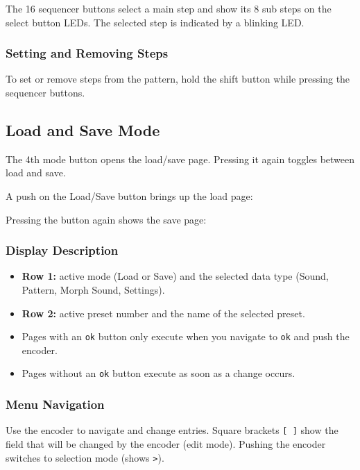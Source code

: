 The 16 sequencer buttons select a main step and show its 8 sub steps on
the select button LEDs. The selected step is indicated by a blinking
LED.

\subsubsection{Setting and Removing
Steps}\label{setting-and-removing-steps}

To set or remove steps from the pattern, hold the shift button while
pressing the sequencer buttons.

\subsection{Load and Save Mode}\label{load-and-save-mode}

The 4th mode button opens the load/save page. Pressing it again toggles
between load and save.

A push on the Load/Save button brings up the load page:


Pressing the button again shows the save page:


\subsubsection{Display Description}\label{display-description}

\begin{itemize}
\tightlist
\item
  \textbf{Row 1:} active mode (Load or Save) and the selected data type
  (Sound, Pattern, Morph Sound, Settings).
\item
  \textbf{Row 2:} active preset number and the name of the selected
  preset.
\item
  Pages with an \texttt{ok} button only execute when you navigate to
  \texttt{ok} and push the encoder.
\item
  Pages without an \texttt{ok} button execute as soon as a change
  occurs.
\end{itemize}

\subsubsection{Menu Navigation}\label{menu-navigation}

Use the encoder to navigate and change entries. Square brackets
\texttt{{[}\ {]}} show the field that will be changed by the encoder
(edit mode). Pushing the encoder switches to selection mode (shows
\texttt{\textgreater{}}).

